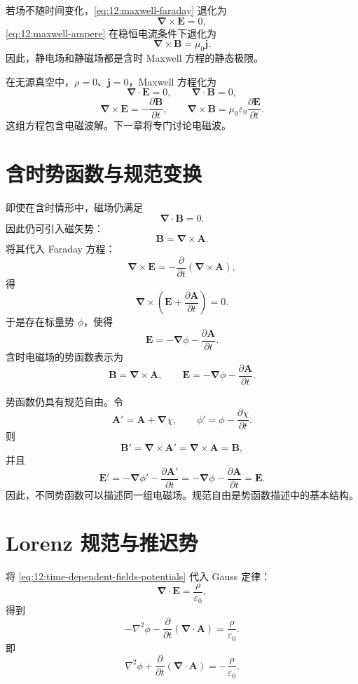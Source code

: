 若场不随时间变化，\eqref{eq:12:maxwell-faraday} 退化为
\[
\bm{\nabla}\times\bm{E}=0,
\]
\eqref{eq:12:maxwell-ampere} 在稳恒电流条件下退化为
\[
\bm{\nabla}\times\bm{B}=\mu_{0}\bm{j}.
\]
因此，静电场和静磁场都是含时 Maxwell 方程的静态极限。

在无源真空中，$\rho=0$、$\bm{j}=0$，Maxwell 方程化为
\[
\bm{\nabla}\cdot\bm{E}=0,
\qquad
\bm{\nabla}\cdot\bm{B}=0,
\]
\[
\bm{\nabla}\times\bm{E}
=
-\frac{\partial\bm{B}}{\partial t},
\qquad
\bm{\nabla}\times\bm{B}
=
\mu_{0}\varepsilon_{0}
\frac{\partial\bm{E}}{\partial t}.
\]
这组方程包含电磁波解。下一章将专门讨论电磁波。

\section{含时势函数与规范变换}

即使在含时情形中，磁场仍满足
\[
\bm{\nabla}\cdot\bm{B}=0.
\]
因此仍可引入磁矢势：
\[
\bm{B}
=
\bm{\nabla}\times\bm{A}.
\]
将其代入 Faraday 方程：
\[
\bm{\nabla}\times\bm{E}
=
-\frac{\partial}{\partial t}
(\bm{\nabla}\times\bm{A}),
\]
得
\[
\bm{\nabla}\times
\left(
\bm{E}
+
\frac{\partial\bm{A}}{\partial t}
\right)
=0.
\]
于是存在标量势 $\phi$，使得
\begin{equation}
	\bm{E}
	=
	-\bm{\nabla}\phi
	-
	\frac{\partial\bm{A}}{\partial t}.
	\label{eq:12:time-dependent-fields-potentials}
\end{equation}
含时电磁场的势函数表示为
\[
\bm{B}
=
\bm{\nabla}\times\bm{A},
\qquad
\bm{E}
=
-\bm{\nabla}\phi
-
\frac{\partial\bm{A}}{\partial t}.
\]

势函数仍具有规范自由。令
\begin{equation}
	\bm{A}'
	=
	\bm{A}
	+
	\bm{\nabla}\chi,
	\qquad
	\phi'
	=
	\phi
	-
	\frac{\partial\chi}{\partial t}.
	\label{eq:12:gauge-transformation}
\end{equation}
则
\[
\bm{B}'
=
\bm{\nabla}\times\bm{A}'
=
\bm{\nabla}\times\bm{A}
=
\bm{B},
\]
并且
\[
\bm{E}'
=
-\bm{\nabla}\phi'
-
\frac{\partial\bm{A}'}{\partial t}
=
-\bm{\nabla}\phi
-
\frac{\partial\bm{A}}{\partial t}
=
\bm{E}.
\]
因此，不同势函数可以描述同一组电磁场。规范自由是势函数描述中的基本结构。

\section{Lorenz 规范与推迟势}

将 \eqref{eq:12:time-dependent-fields-potentials} 代入 Gauss 定律：
\[
\bm{\nabla}\cdot\bm{E}
=
\frac{\rho}{\varepsilon_{0}},
\]
得到
\[
-\nabla^{2}\phi
-
\frac{\partial}{\partial t}
(\bm{\nabla}\cdot\bm{A})
=
\frac{\rho}{\varepsilon_{0}}.
\]
即
\begin{equation}
	\nabla^{2}\phi
	+
	\frac{\partial}{\partial t}
	(\bm{\nabla}\cdot\bm{A})
	=
	-\frac{\rho}{\varepsilon_{0}}.
	\label{eq:12:potential-equation-phi-raw}
\end{equation}

